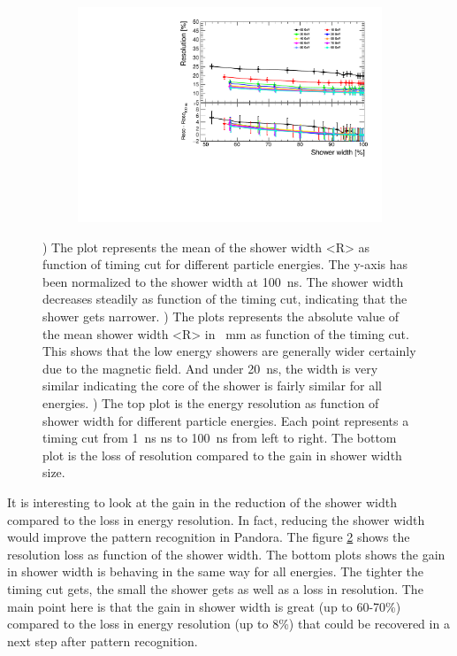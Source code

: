 \begin{figure}[htbp!]
\begin{subfigure}[t]{0.48\textwidth}
    \includegraphics[width=1\linewidth]{../Thesis_Plots/ILD/NoSmearing/Plots/ShowerWidth_Resolution_noSmearing}
    \caption{}  \label{fig:ShowerWidthResoNoSmearing}
  \end{subfigure}
  \caption{) The plot represents the mean of the shower width <R> as function of timing cut for different particle energies. The y-axis has been normalized to the shower width at \SI{100}{\nano\second}. The shower width decreases steadily as function of the timing cut, indicating that the shower gets narrower. ) The plots represents the absolute value of the mean shower width <R> in \SI{}{\milli\meter} as function of the timing cut. This shows that the low energy showers are generally wider certainly due to the magnetic field. And under \SI{20}{\nano\second}, the width is very similar indicating the core of the shower is fairly similar for all energies. ) The top plot is the energy resolution as function of shower width for different particle energies. Each point represents a timing cut from \SI{1}{\nano\second} ns to \SI{100}{\nano\second} from left to right. The bottom plot is the loss of resolution compared to the gain in shower width size.}
\end{figure}

It is interesting to look at the gain in the reduction of the shower width compared to the loss in energy resolution. In fact, reducing the shower width would improve the pattern recognition in Pandora. The figure \ref{fig:ShowerWidthResoNoSmearing} shows the resolution loss as function of the shower width. The bottom plots shows the gain in shower width is behaving in the same way for all energies. The tighter the timing cut gets, the small the shower gets as well as a loss in resolution. The main point here is that the gain in shower width is great (up to 60-70\%) compared to the loss in energy resolution (up to 8\%) that could be recovered in a next step after pattern recognition.

